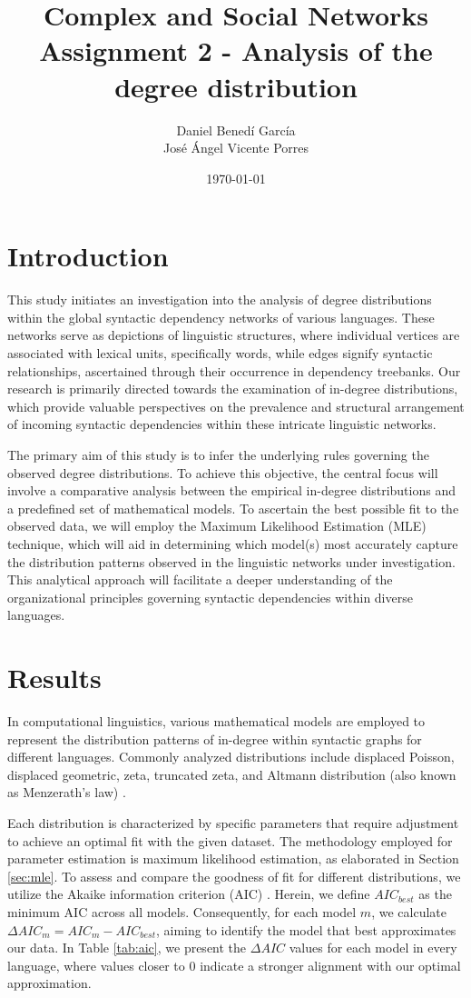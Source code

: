 \documentclass{article}
\title{Complex and Social Networks \\ Assignment 2 - Analysis of the degree distribution}
\author{Daniel Benedí García\\ José Ángel Vicente Porres}
\date{\monthyeardate\today}
\begin{document}
\maketitle

\section{Introduction}
This study initiates an investigation into the analysis of degree distributions within the global syntactic dependency networks of various languages. These networks serve as depictions of linguistic structures, where individual vertices are associated with lexical units, specifically words, while edges signify syntactic relationships, ascertained through their occurrence in dependency treebanks. Our research is primarily directed towards the examination of in-degree distributions, which provide valuable perspectives on the prevalence and structural arrangement of incoming syntactic dependencies within these intricate linguistic networks.

The primary aim of this study is to infer the underlying rules governing the observed degree distributions. To achieve this objective, the central focus will involve a comparative analysis between the empirical in-degree distributions and a predefined set of mathematical models. To ascertain the best possible fit to the observed data, we will employ the Maximum Likelihood Estimation (MLE) technique, which will aid in determining which model(s) most accurately capture the distribution patterns observed in the linguistic networks under investigation. This analytical approach will facilitate a deeper understanding of the organizational principles governing syntactic dependencies within diverse languages.

\section{Results}
In computational linguistics, various mathematical models are employed to represent the distribution patterns of in-degree within syntactic graphs for different languages. Commonly analyzed distributions include displaced Poisson, displaced geometric, zeta, truncated zeta, and Altmann distribution (also known as Menzerath's law) \cite{altmann1980prolegomena}.

Each distribution is characterized by specific parameters that require adjustment to achieve an optimal fit with the given dataset. The methodology employed for parameter estimation is maximum likelihood estimation, as elaborated in Section \ref{sec:mle}. To assess and compare the goodness of fit for different distributions, we utilize the Akaike information criterion (AIC) \cite{Akaike1998}. Herein, we define $AIC_{best}$ as the minimum AIC across all models. Consequently, for each model $m$, we calculate $\Delta AIC_m = AIC_m - AIC_{best}$, aiming to identify the model that best approximates our data. In Table \ref{tab:aic}, we present the $\Delta AIC$ values for each model in every language, where values closer to 0 indicate a stronger alignment with our optimal approximation.
\end{document}
